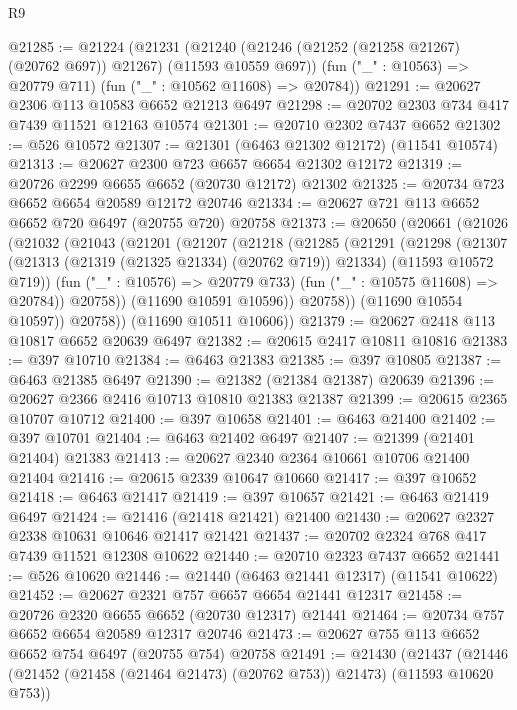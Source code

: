 \begin{lexlean}{R9}
\begin{coremodule}
{{{{{{{{{{{{{{{{{{{{{{{{{{{{{{{{{{{{{{{{{{{{{{{{{{{{{{{{{{{{{{{{{{{{{{{{{{{{{{{{{{{{@21285 := @21224
    (@21231
      (@21240 (@21246 (@21252 (@21258 @21267) (@20762 @697)) @21267) (@11593 @10559 @697))
      (fun ("_" : @10563) => @20779 @711)
      (fun ("_" : @10562 @11608) => @20784))
@21291 := @20627 @2306 @113 @10583 @6652 @21213 @6497
@21298 := @20702 @2303 @734 @417 @7439 @11521 @12163 @10574
@21301 := @20710 @2302 @7437 @6652
@21302 := @526 @10572
@21307 := @21301 (@6463 @21302 @12172) (@11541 @10574)
@21313 := @20627 @2300 @723 @6657 @6654 @21302 @12172
@21319 := @20726 @2299 @6655 @6652 (@20730 @12172) @21302
@21325 := @20734 @723 @6652 @6654 @20589 @12172 @20746
@21334 := @20627 @721 @113 @6652 @6652 @720 @6497 (@20755 @720) @20758
@21373 := @20650
    (@20661
      (@21026
        (@21032
          (@21043
            (@21201
              (@21207
                (@21218
                  (@21285
                    (@21291
                      (@21298
                        (@21307
                          (@21313 (@21319 (@21325 @21334) (@20762 @719)) @21334)
                          (@11593 @10572 @719))
                        (fun ("_" : @10576) => @20779 @733)
                        (fun ("_" : @10575 @11608) => @20784))
                      @20758))
                  (@11690 @10591 @10596))
                @20758))
            (@11690 @10554 @10597))
          @20758))
      (@11690 @10511 @10606))
@21379 := @20627 @2418 @113 @10817 @6652 @20639 @6497
@21382 := @20615 @2417 @10811 @10816
@21383 := @397 @10710
@21384 := @6463 @21383
@21385 := @397 @10805
@21387 := @6463 @21385 @6497
@21390 := @21382 (@21384 @21387) @20639
@21396 := @20627 @2366 @2416 @10713 @10810 @21383 @21387
@21399 := @20615 @2365 @10707 @10712
@21400 := @397 @10658
@21401 := @6463 @21400
@21402 := @397 @10701
@21404 := @6463 @21402 @6497
@21407 := @21399 (@21401 @21404) @21383
@21413 := @20627 @2340 @2364 @10661 @10706 @21400 @21404
@21416 := @20615 @2339 @10647 @10660
@21417 := @397 @10652
@21418 := @6463 @21417
@21419 := @397 @10657
@21421 := @6463 @21419 @6497
@21424 := @21416 (@21418 @21421) @21400
@21430 := @20627 @2327 @2338 @10631 @10646 @21417 @21421
@21437 := @20702 @2324 @768 @417 @7439 @11521 @12308 @10622
@21440 := @20710 @2323 @7437 @6652
@21441 := @526 @10620
@21446 := @21440 (@6463 @21441 @12317) (@11541 @10622)
@21452 := @20627 @2321 @757 @6657 @6654 @21441 @12317
@21458 := @20726 @2320 @6655 @6652 (@20730 @12317) @21441
@21464 := @20734 @757 @6652 @6654 @20589 @12317 @20746
@21473 := @20627 @755 @113 @6652 @6652 @754 @6497 (@20755 @754) @20758
@21491 := @21430
    (@21437
      (@21446 (@21452 (@21458 (@21464 @21473) (@20762 @753)) @21473) (@11593 @10620 @753))
}}}}}}}}}}}}}}}}}}}}}}}}}}}}}}}}}}}}}}}}}}}}}}}}}}}}}}}}}}}}}}}}}}}}}}}}}}}}}}}}}}}}
\end{coremodule}
\end{lexlean}
